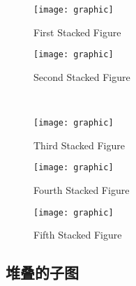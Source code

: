 \begin{figure}[htbp]
	\centering
	\begin{minipage}[t]{0.25\linewidth}
		\centering
		\texttt{[image: graphic]}
		\caption{First Stacked Figure}
		\label{fig:stacked:first}
	\end{minipage}%
	\hspace{1cm}%
	\begin{minipage}[t]{0.25\linewidth}
		\centering
		\texttt{[image: graphic]}
		\caption{Second Stacked Figure}
		\label{fig:stacked:second}
	\end{minipage}\\[20pt]
	\begin{minipage}[t]{0.25\linewidth}
		\centering
		\texttt{[image: graphic]}
		\caption{Third Stacked Figure}
		\label{fig:stacked:third}
	\end{minipage}%
	\hspace{1cm}%
	\begin{minipage}[t]{0.25\linewidth}
		\centering
		\texttt{[image: graphic]}
		\caption{Fourth Stacked Figure}
		\label{fig:stacked:fourth}
	\end{minipage}%
	\hspace{1cm}%
	\begin{minipage}[t]{0.25\linewidth}
		\centering
		\texttt{[image: graphic]}
		\caption{Fifth Stacked Figure}
		\label{fig:stacked:fifth}
	\end{minipage}%
\end{figure}

\subsection{堆叠的子图}


